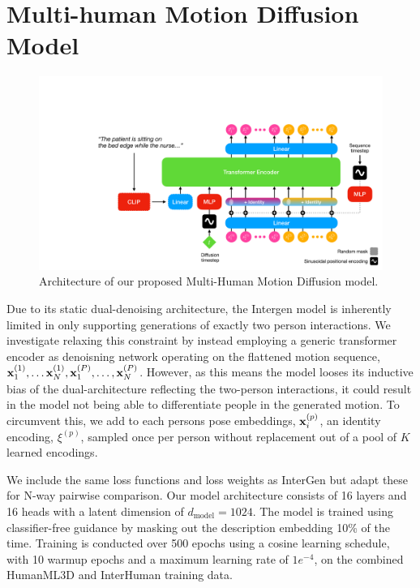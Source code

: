 \section{Multi-human Motion Diffusion Model}
\begin{figure}[H]
    \hspace*{-1cm}
    \includegraphics[width=\linewidth+1cm]{figures/diffusion-model.pdf}
    \caption{Architecture of our proposed Multi-Human Motion Diffusion model.}
    \label{fig:diffusion-model}
\end{figure}
Due to its static dual-denoising architecture, the Intergen model is inherently limited in only supporting generations of exactly two person interactions. We investigate relaxing this constraint by instead employing a generic transformer encoder as denoisning network operating on the flattened motion sequence, $\boldsymbol{\mathbf{x}}_1^{(1)}, \ldots \boldsymbol{\mathbf{x}}_N^{(1)}, \boldsymbol{\mathbf{x}}_1^{(P)}, \ldots, \boldsymbol{\mathbf{x}}_N^{(P)}$. However, as this means the model looses its inductive bias of the dual-architecture reflecting the two-person interactions, it could result in the model not being able to differentiate people in the generated motion. To circumvent this, we add to each persons pose embeddings, $\boldsymbol{\mathbf{x}}_i^{(p)}$, an identity encoding,  $\xi^{(p)}$, sampled once per person without replacement out of a pool of $K$ learned encodings.

We include the same loss functions and loss weights as InterGen but adapt these for N-way pairwise comparison. Our model architecture consists of 16 layers and 16 heads with a latent dimension of $d_\text{model} = 1024$. The model is trained using classifier-free guidance by masking out the description embedding 10\% of the time. Training is conducted over 500 epochs using a cosine learning schedule, with 10 warmup epochs and a maximum learning rate of $1e^{-4}$, on the combined HumanML3D and InterHuman training data.

